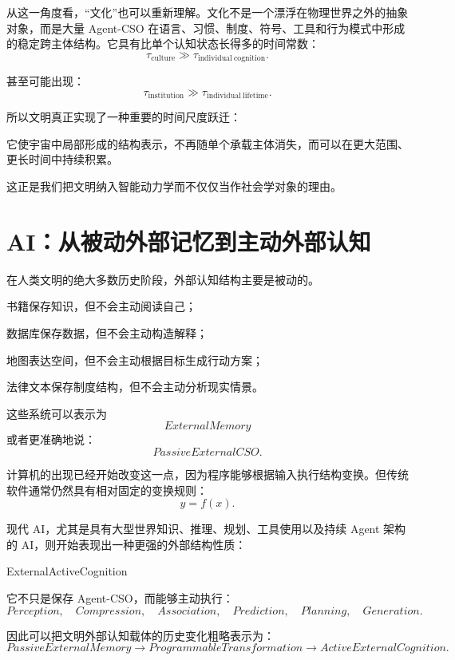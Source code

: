 从这一角度看，“文化”也可以重新理解。文化不是一个漂浮在物理世界之外的抽象对象，而是大量 Agent-CSO 在语言、习惯、制度、符号、工具和行为模式中形成的稳定跨主体结构。它具有比单个认知状态长得多的时间常数：
\[
\tau_{\mathrm{culture}}
\gg
\tau_{\mathrm{individual\ cognition}}.
\]

甚至可能出现：
\[
\tau_{\mathrm{institution}}
\gg
\tau_{\mathrm{individual\ lifetime}}.
\]

所以文明真正实现了一种重要的时间尺度跃迁：
\begin{statementbox}
\centering
{}
\end{statementbox}

它使宇宙中局部形成的结构表示，不再随单个承载主体消失，而可以在更大范围、更长时间中持续积累。

这正是我们把文明纳入智能动力学而不仅仅当作社会学对象的理由。


\section{AI：从被动外部记忆到主动外部认知}

在人类文明的绝大多数历史阶段，外部认知结构主要是被动的。

书籍保存知识，但不会主动阅读自己；

数据库保存数据，但不会主动构造解释；

地图表达空间，但不会主动根据目标生成行动方案；

法律文本保存制度结构，但不会主动分析现实情景。

这些系统可以表示为
\[
ExternalMemory
\]
或者更准确地说：
\[
PassiveExternalCSO.
\]

计算机的出现已经开始改变这一点，因为程序能够根据输入执行结构变换。但传统软件通常仍然具有相对固定的变换规则：
\[
y=f(x).
\]

现代 AI，尤其是具有大型世界知识、推理、规划、工具使用以及持续 Agent 架构的 AI，则开始表现出一种更强的外部结构性质：
\begin{statementbox}
ExternalActiveCognition
\end{statementbox}

它不只是保存 Agent-CSO，而能够主动执行：
\[
Perception,
\quad
Compression,
\quad
Association,
\quad
Prediction,
\quad
Planning,
\quad
Generation.
\]

因此可以把文明外部认知载体的历史变化粗略表示为：
\[
PassiveExternalMemory
\rightarrow
ProgrammableTransformation
\rightarrow
ActiveExternalCognition.
\]

